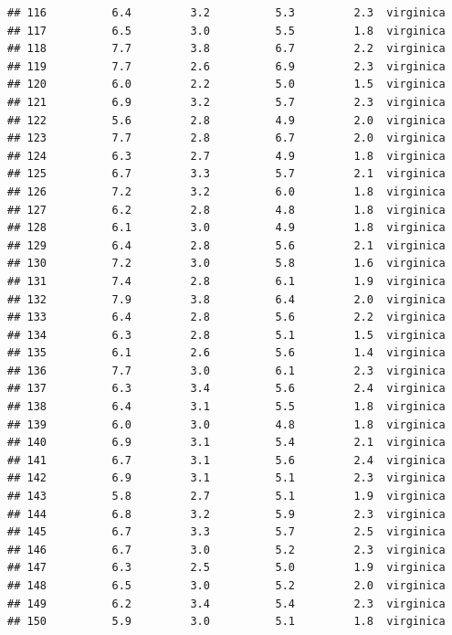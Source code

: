 \documentclass[
]{book}
\newenvironment{Shaded}{\begin{snugshade}}{\end{snugshade}}
\newcommand{\FunctionTok}[1]{\textcolor[rgb]{0.13,0.29,0.53}{\textbf{#1}}}
\newcommand{\NormalTok}[1]{#1}
\newcommand{\SpecialCharTok}[1]{\textcolor[rgb]{0.81,0.36,0.00}{\textbf{#1}}}
\begin{document}
\begin{verbatim}
## 116          6.4         3.2          5.3         2.3  virginica
## 117          6.5         3.0          5.5         1.8  virginica
## 118          7.7         3.8          6.7         2.2  virginica
## 119          7.7         2.6          6.9         2.3  virginica
## 120          6.0         2.2          5.0         1.5  virginica
## 121          6.9         3.2          5.7         2.3  virginica
## 122          5.6         2.8          4.9         2.0  virginica
## 123          7.7         2.8          6.7         2.0  virginica
## 124          6.3         2.7          4.9         1.8  virginica
## 125          6.7         3.3          5.7         2.1  virginica
## 126          7.2         3.2          6.0         1.8  virginica
## 127          6.2         2.8          4.8         1.8  virginica
## 128          6.1         3.0          4.9         1.8  virginica
## 129          6.4         2.8          5.6         2.1  virginica
## 130          7.2         3.0          5.8         1.6  virginica
## 131          7.4         2.8          6.1         1.9  virginica
## 132          7.9         3.8          6.4         2.0  virginica
## 133          6.4         2.8          5.6         2.2  virginica
## 134          6.3         2.8          5.1         1.5  virginica
## 135          6.1         2.6          5.6         1.4  virginica
## 136          7.7         3.0          6.1         2.3  virginica
## 137          6.3         3.4          5.6         2.4  virginica
## 138          6.4         3.1          5.5         1.8  virginica
## 139          6.0         3.0          4.8         1.8  virginica
## 140          6.9         3.1          5.4         2.1  virginica
## 141          6.7         3.1          5.6         2.4  virginica
## 142          6.9         3.1          5.1         2.3  virginica
## 143          5.8         2.7          5.1         1.9  virginica
## 144          6.8         3.2          5.9         2.3  virginica
## 145          6.7         3.3          5.7         2.5  virginica
## 146          6.7         3.0          5.2         2.3  virginica
## 147          6.3         2.5          5.0         1.9  virginica
## 148          6.5         3.0          5.2         2.0  virginica
## 149          6.2         3.4          5.4         2.3  virginica
## 150          5.9         3.0          5.1         1.8  virginica
\end{verbatim}

\begin{Shaded}
\end{Shaded}
\end{document}
